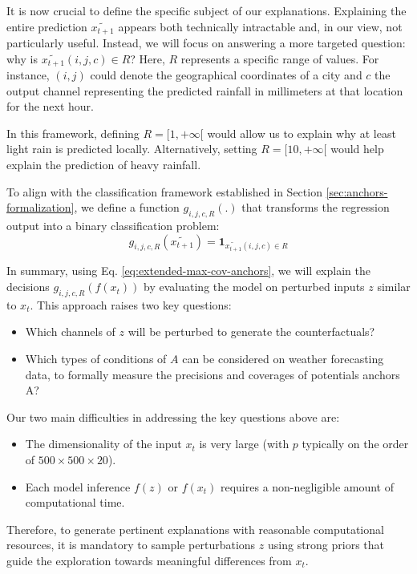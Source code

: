 It is now crucial to define the specific subject of our explanations. Explaining the entire prediction $\widetilde{x_{t+1}}$ appears both technically intractable and, in our view, not particularly useful. Instead, we will focus on answering a more targeted question: why is $\widetilde{x_{t+1}}(i, j, c) \in R$? Here, $R$ represents a specific range of values. For instance, $(i, j)$ could denote the geographical coordinates of a city and $c$ the output channel representing the predicted rainfall in millimeters at that location for the next hour.

In this framework, defining $R = [ 1, +\infty [$ would allow us to explain why at least light rain is predicted locally. Alternatively, setting $R = [10, +\infty [$ would help explain the prediction of heavy rainfall.

To align with the classification framework established in Section \ref{sec:anchors-formalization}, we define a function $g_{i,j,c,R}(.)$ that transforms the regression output into a binary classification problem:
\begin{equation}
	g_{i,j,c,R}(\widetilde{x_{t+1}}) = \mathbf{1}_{\widetilde{x_{t+1}}(i, j, c) \in R}
\end{equation}

In summary, using Eq. \ref{eq:extended-max-cov-anchors}, we will explain the decisions $g_{i,j,c,R}(f(x_t))$ by evaluating the model on perturbed inputs $z$ similar to $x_t$. This approach raises two key questions:
\begin{itemize}
	\item Which channels of $z$ will be perturbed to generate the counterfactuals?
	\item Which types of conditions of $A$ can be considered on weather forecasting data, to formally measure the precisions and coverages of potentials anchors A?
\end{itemize}

Our two main difficulties in addressing the key questions above are:
\begin{itemize}
\item The dimensionality of the input $x_t$ is very large (with $p$ typically on the order of $500 \times 500 \times 20$).
\item Each model inference $f(z)$ or $f(x_t)$ requires a non-negligible amount of computational time.
\end{itemize}

Therefore, to generate pertinent explanations with reasonable computational resources, it is mandatory to sample perturbations $z$ using strong priors that guide the exploration towards meaningful differences from $x_t$.

